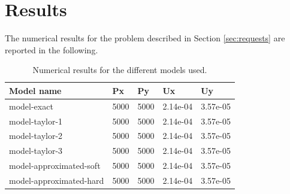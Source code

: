 \section{Results}
\label{sec:results}

The numerical results for the problem described in Section \ref{sec:requests} are reported in the following.

\begin{table}[H]
    \centering
    \begin{tabular}{|l|l|l|l|l|}
        \hline
        \textbf{Model name}     & \textbf{Px} & \textbf{Py} & \textbf{Ux} & \textbf{Uy} \\ \hline
        model-exact             & 5000        & 5000        & 2.14e-04    & 3.57e-05    \\ \hline
        model-taylor-1          & 5000        & 5000        & 2.14e-04    & 3.57e-05    \\ \hline
        model-taylor-2          & 5000        & 5000        & 2.14e-04    & 3.57e-05    \\ \hline
        model-taylor-3          & 5000        & 5000        & 2.14e-04    & 3.57e-05    \\ \hline
        model-approximated-soft & 5000        & 5000        & 2.14e-04    & 3.57e-05    \\ \hline
        model-approximated-hard & 5000        & 5000        & 2.14e-04    & 3.57e-05    \\ \hline
    \end{tabular}
    \caption{Numerical results for the different models used.}
    \label{tab:results_Px5000_Py5000}
\end{table}


